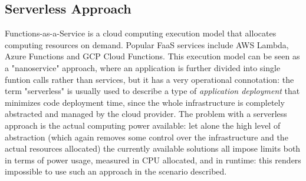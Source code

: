 \subsection{Serverless Approach}
  Functions-as-a-Service is a cloud computing execution model that allocates computing resources on demand. Popular FaaS services include AWS Lambda, Azure Functions and GCP Cloud Functions. This execution model can be seen as a "nanoservice" approach, where an application is further divided into single funtion calls rather than services, but it has a very operational connotation: the term "serverless" is usually used to describe a type of \textit{application deployment} that minimizes code deployment time, since the whole infrastructure is completely abstracted and managed by the cloud provider. The problem with a serverless approach is the actual computing power available: let alone the high level of abstraction (which again removes some control over the infrastructure and the actual resources allocated) the currently available solutions all impose limits both in terms of power usage, measured in CPU allocated, and in runtime: this renders impossible to use such an approach in the scenario described. 
\label{sse:serverless}


